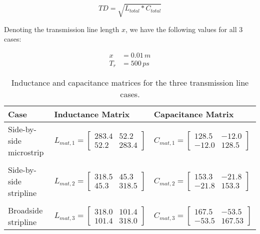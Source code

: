 \documentclass[../main.tex]{subfiles}
\begin{document}
\begin{equation} \label{eq:td}
    TD = \sqrt{L_{total} * C_{total}}
\end{equation}

Denoting the transmission line length $x$, we have the following values for all 3 cases:

\begin{align*}
    x &= 0.01\,\si{m} \\
    T_r &= 500\,\si{ps}
\end{align*}

\newpage

\begin{table}[t]
    \centering
    \begin{tabular}{l|l l}
        \toprule[1pt]
        \textbf{Case} & \textbf{Inductance Matrix} & \textbf{Capacitance Matrix} \\
        \midrule
        Side-by-side microstrip &
        $L_{mat,1} =
        \begin{bmatrix}
            283.4 & 52.2 \\
            52.2 & 283.4
        \end{bmatrix}$ &
        $C_{mat,1} =
        \begin{bmatrix}
            128.5 & -12.0 \\
            -12.0 & 128.5
        \end{bmatrix}$ \\
        && \\
        Side-by-side stripline &
        $L_{mat,2} =
        \begin{bmatrix}
            318.5 & 45.3 \\
            45.3 & 318.5
        \end{bmatrix}$ &
        $C_{mat,2} =
        \begin{bmatrix}
            153.3 & -21.8 \\
            -21.8 & 153.3
        \end{bmatrix}$ \\
        && \\
        Broadside stripline &
        $L_{mat,3} =
        \begin{bmatrix}
            318.0 & 101.4 \\
            101.4 & 318.0
        \end{bmatrix}$ &
        $C_{mat,3} =
        \begin{bmatrix}
            167.5 & -53.5 \\
            -53.5 &167.53
        \end{bmatrix}$ \\
        \bottomrule[1pt]
    \end{tabular}
    \caption{Inductance and capacitance matrices for the three transmission line cases.}
    \label{tab:lc-matrix}
\end{table}
\end{document}
